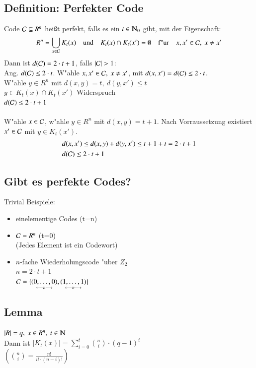 \subsection{Definition: Perfekter Code}
Code $\mathcal{C} \subseteq R^n$ hei\ss t perfekt, falls es ein $t \in \N_0$ gibt, mit der Eigenschaft:
\[
	R^n = \bigcup_{x \in \mathcal{C}} K_t(x) \quad \text{und} \quad K_t(x) \cap K_t(x') = \emptyset \quad \text{f"ur}\quad x,x' \in \mathcal{C},\ x \neq x'
\]
Dann ist $d(\mathcal{C})=2 \cdot t + 1$, falls $\left| \mathcal{C} \right| > 1$: \\
Ang. $d(\mathcal{C}) \leq 2\cdot t$. W"ahle $x,x' \in \mathcal{C},\ x \neq x'$, mit $d(x,x') = d(\mathcal{C}) \leq 2 \cdot t$. \\
W"ahle $y \in R^n$ mit $d(x,y)=t,\ d(y,x') \leq t$\\
$y \in K_t(x) \cap K_t(x')$ Widerspruch\\
$d(\mathcal{C}) \leq 2 \cdot t + 1$ \\
\\
W"ahle $x \in \mathcal{C}$, w"ahle $y \in R^n$ mit $d(x,y)=t+1$. Nach Vorraussetzung existiert $x' \in \mathcal{C}$ mit $y \in K_t(x')$. 
\begin{align*}
	&d(x,x') \leq d(x,y) + d(y,x') \leq t+1+t = 2 \cdot t + 1 \\
	&d(\mathcal{C}) \leq 2\cdot t + 1
\end{align*}	

\subsection{Gibt es perfekte Codes?}
Trivial Beispiele:
\begin{itemize}
	\item einelementige Codes (t=n)
	\item $\mathcal{C} = R^n$ (t=0) \\
				(Jedes Element ist ein Codewort)
	\item $n$-fache Wiederholungscode "uber $Z_2$ \\
				$n=2 \cdot t +1$ \\
				$\mathcal{C} = \lbrace \underset{\longleftarrow n \longrightarrow}{(0,\ldots,0)},\underset{\longleftarrow n \longrightarrow}{(1,\ldots,1)}\rbrace$
\end{itemize}

\subsection{Lemma}
$\left| R \right| = q,\ x \in R^n,\ t \in \N$ \\
Dann ist $\left| K_t(x) \right| = \sum_{i=0}^t \binom{n}{i} \cdot (q-1)^i$ \\
$\left(\binom{n}{i}=\frac{n!}{i! \cdot (n-i)!}\right)$


